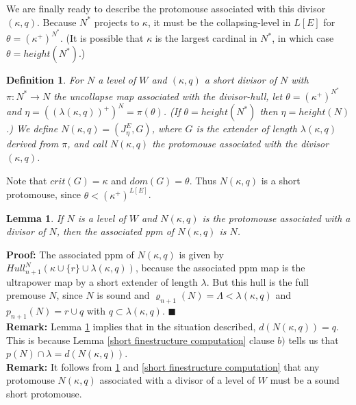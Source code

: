 \documentclass[12pt]{article}
\newtheorem{lem}[thm]{Lemma}
\newtheorem{defn}[thm]{Definition}
\begin{document}
We are finally ready to describe the protomouse associated with this divisor $(\kappa , q )$.  Because $N^*$ projects to $\kappa$, it must be the collapsing-level in $L[E]$ for $\theta = (\kappa^+ )^{N^*}$.  (It is possible that $\kappa$ is the largest cardinal in $N^*$, in which case $\theta = height(N^* )$.)\\


\begin{defn} \label{protomouse associated with divisor}
For $N$ a level of $W$ and $(\kappa , q)$ a short divisor of $N$ with $\pi : N^* \longrightarrow N$ the uncollapse map associated with the divisor-hull, let $\theta = (\kappa^+ )^{N^*}$ and $\eta = (( \lambda (\kappa , q ) )^+)^{N} = \pi (\theta )$.  (If $\theta = height (N^* )$ then $\eta = height (N)$.)  We define $N (\kappa , q) = (J_\eta^E , G )$, where $G$ is the extender of length $\lambda (\kappa , q )$ derived from $\pi$, and call $N (\kappa , q)$ the protomouse associated with the divisor $(\kappa , q)$.
\end{defn}

Note that $crit(G) = \kappa$ and $dom (G) = \theta$.  Thus $N (\kappa , q)$ is a short protomouse, since $\theta < ( \kappa^+ )^{L[E]}$.\\



\begin{lem} \label{short associated associated is original}
If $N$ is a level of $W$ and $N (\kappa , q)$ is the protomouse associated with a divisor of $N$, then the associated ppm of $N (\kappa , q)$ is $N$.
\end{lem}

\textbf{Proof:}  The associated ppm of $N(\kappa , q )$ is given by $Hull_{n+1}^N ( \kappa \cup \{ r \} \cup \lambda (\kappa, q))$, because the associated ppm map is the ultrapower map by a short extender of length $\lambda$.  But this hull is the full premouse $N$, since $N$ is sound and $\varrho_{n+1} (N) = \Lambda < \lambda (\kappa , q)$ and $p _{n+1}(N) = r \cup q$ with $q \subset \lambda(\kappa , q)$. $\blacksquare$\\

\textbf{Remark:}  Lemma \ref{short associated associated is original} implies that in the situation described, $d(N(\kappa , q)) = q$.  This is because Lemma \ref{short finestructure computation} clause $b)$ tells us that $p(N) \cap \lambda = d(N(\kappa , q))$.\\

\textbf{Remark:}  It follows from \ref{short associated associated is original} and \ref{short finestructure computation} that any protomouse $N(\kappa , q)$ associated with a divisor of a level of $W$ must be a sound short protomouse.\\
\end{document}
